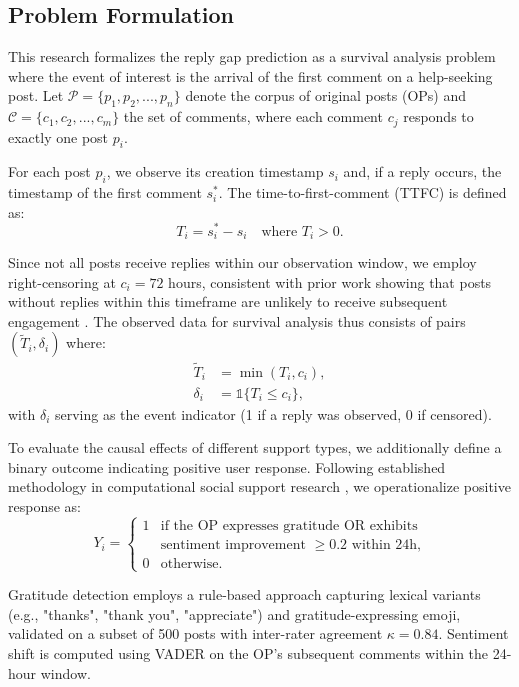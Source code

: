 \documentclass[letterpaper]{article} %
\begin{document}
\subsection{Problem Formulation}
This research formalizes the reply gap prediction as a survival analysis problem where the event of interest is the arrival of the first comment on a help-seeking post. Let $\mathcal{P} = \{p_1, p_2, ..., p_n\}$ denote the corpus of original posts (OPs) and $\mathcal{C} = \{c_1, c_2, ..., c_m\}$ the set of comments, where each comment $c_j$ responds to exactly one post $p_i$.

For each post $p_i$, we observe its creation timestamp $s_i$ and, if a reply occurs, the timestamp of the first comment $s_i^*$. The time-to-first-comment (TTFC) is defined as:
\begin{equation}
T_i = s_i^* - s_i \quad \text{where } T_i > 0.
\end{equation}

Since not all posts receive replies within our observation window, we employ right-censoring at $c_i = 72$ hours, consistent with prior work showing that posts without replies within this timeframe are unlikely to receive subsequent engagement \citep{sharma2020engagement}. The observed data for survival analysis thus consists of pairs $(\tilde{T}_i, \delta_i)$ where:
\begin{align}
\tilde{T}_i &= \min(T_i, c_i), \\
\delta_i &= \mathbb{1}\{T_i \leq c_i\},
\end{align}
with $\delta_i$ serving as the event indicator (1 if a reply was observed, 0 if censored).

To evaluate the causal effects of different support types, we additionally define a binary outcome indicating positive user response. Following established methodology in computational social support research \citep{saha2020causal}, we operationalize positive response as:
\begin{equation}
Y_i = 
\begin{cases}
1 & \text{if the OP expresses gratitude OR exhibits} \\
  & \text{sentiment improvement } \geq 0.2 \text{ within 24h,} \\
0 & \text{otherwise.}
\end{cases}
\end{equation}

Gratitude detection employs a rule-based approach capturing lexical variants (e.g., "thanks", "thank you", "appreciate") and gratitude-expressing emoji, validated on a subset of 500 posts with inter-rater agreement $\kappa = 0.84$. Sentiment shift is computed using VADER \citep{hutto2014vader} on the OP's subsequent comments within the 24-hour window.
\end{document}
